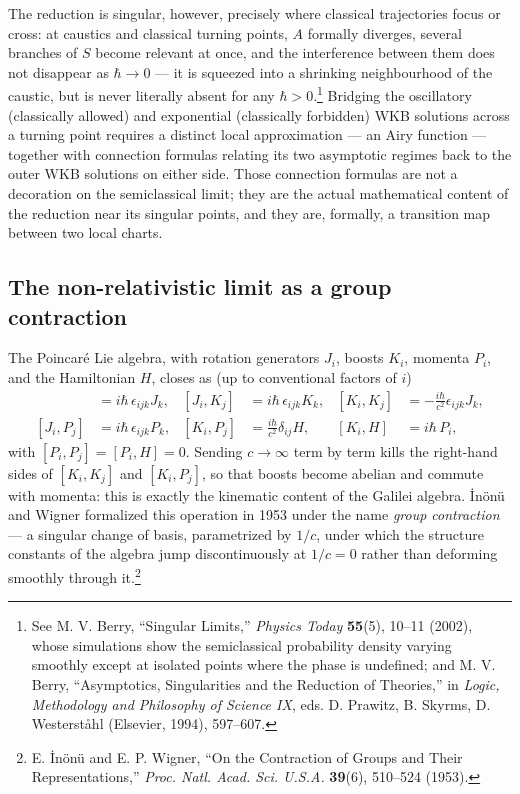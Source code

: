 \documentclass[11pt]{book}
\begin{document}
The reduction is singular, however, precisely where classical trajectories focus or cross: at caustics and classical turning points, $A$ formally diverges, several branches of $S$ become relevant at once, and the interference between them does not disappear as $\hbar\to 0$ --- it is squeezed into a shrinking neighbourhood of the caustic, but is never literally absent for any $\hbar>0$.\footnote{See M. V. Berry, ``Singular Limits,'' \emph{Physics Today} \textbf{55}(5), 10--11 (2002), whose simulations show the semiclassical probability density varying smoothly except at isolated points where the phase is undefined; and M. V. Berry, ``Asymptotics, Singularities and the Reduction of Theories,'' in \emph{Logic, Methodology and Philosophy of Science IX}, eds. D. Prawitz, B. Skyrms, D. Westerst\aa hl (Elsevier, 1994), 597--607.} Bridging the oscillatory (classically allowed) and exponential (classically forbidden) WKB solutions across a turning point requires a distinct local approximation --- an Airy function --- together with connection formulas relating its two asymptotic regimes back to the outer WKB solutions on either side. Those connection formulas are not a decoration on the semiclassical limit; they are the actual mathematical content of the reduction near its singular points, and they are, formally, a transition map between two local charts.

\subsection{The non-relativistic limit as a group contraction}
\label{sec:contraction}

The Poincar\'e Lie algebra, with rotation generators $J_i$, boosts $K_i$, momenta $P_i$, and the Hamiltonian $H$, closes as (up to conventional factors of $i$)
\begin{align}
[J_i,J_j] &= i\hbar\,\epsilon_{ijk}J_k, & [J_i,K_j] &= i\hbar\,\epsilon_{ijk}K_k, & [K_i,K_j] &= -\frac{i\hbar}{c^2}\epsilon_{ijk}J_k,\\
[J_i,P_j] &= i\hbar\,\epsilon_{ijk}P_k, & [K_i,P_j] &= \frac{i\hbar}{c^2}\delta_{ij}H, & [K_i,H] &= i\hbar\,P_i,
\end{align}
with $[P_i,P_j]=[P_i,H]=0$. Sending $c\to\infty$ term by term kills the right-hand sides of $[K_i,K_j]$ and $[K_i,P_j]$, so that boosts become abelian and commute with momenta: this is exactly the kinematic content of the Galilei algebra. \.{I}n\"on\"u and Wigner formalized this operation in 1953 under the name \emph{group contraction} --- a singular change of basis, parametrized by $1/c$, under which the structure constants of the algebra jump discontinuously at $1/c=0$ rather than deforming smoothly through it.\footnote{E. \.{I}n\"on\"u and E. P. Wigner, ``On the Contraction of Groups and Their Representations,'' \emph{Proc. Natl. Acad. Sci. U.S.A.} \textbf{39}(6), 510--524 (1953).}
\end{document}
